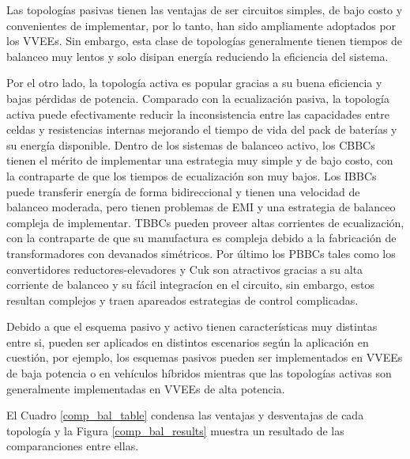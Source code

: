 \documentclass[10pt,a4paper]{article}
\begin{document}
Las topolog\'ias pasivas tienen las ventajas de ser circuitos simples, de bajo
costo y convenientes de implementar, por lo tanto, han sido ampliamente
adoptados por los \acrshort{VVEE}s. Sin embargo, esta clase de topolog\'ias
generalmente tienen tiempos de balanceo muy lentos y solo disipan energ\'ia
reduciendo la eficiencia del sistema.

Por el otro lado, la topolog\'ia activa es popular gracias a su buena eficiencia
y bajas p\'erdidas de potencia. Comparado con la ecualizaci\'on pasiva, la
topolog\'ia activa puede efectivamente reducir la inconsistencia entre las
capacidades entre celdas y resistencias internas mejorando el tiempo de vida del
pack de bater\'ias y su energ\'ia disponible.
Dentro de los sistemas de balanceo activo, los \acrshort{CBBC}s tienen el
m\'erito de implementar una estrategia muy simple y de bajo costo, con la
contraparte de que los tiempos de ecualizaci\'on son muy bajos. Los
\acrshort{IBBC}s puede transferir energ\'ia de forma bidireccional y tienen una
velocidad de balanceo moderada, pero tienen problemas de \acrshort{EMI} y una
estrategia de balanceo compleja de implementar. \acrshort{TBBC}s pueden proveer
altas corrientes de ecualizaci\'on, con la contraparte de que su manufactura es
compleja debido a la fabricaci\'on de transformadores con devanados
sim\'etricos. Por \'ultimo los \acrshort{PBBC}s tales como los
convertidores reductores-elevadores y Cuk son atractivos gracias a su alta
corriente de balanceo y su f\'acil integrac\'ion en el circuito, sin embargo,
estos resultan complejos y traen apareados estrategias de control complicadas.

Debido a que el esquema pasivo y activo tienen caracter\'isticas muy distintas
entre si, pueden ser aplicados en distintos escenarios seg\'un la aplicaci\'on
en cuesti\'on, por ejemplo, los esquemas pasivos pueden ser implementados en
\acrshort{VVEE}s de baja potencia o en veh\'iculos h\'ibridos mientras que las
topolog\'ias activas son generalmente implementadas en \acrshort{VVEE}s de alta
potencia.

El Cuadro \ref{comp_bal_table} condensa las ventajas y desventajas de cada
topolog\'ia y la Figura \ref{comp_bal_results} muestra un resultado de las
comparanciones entre ellas. 
\end{document}
